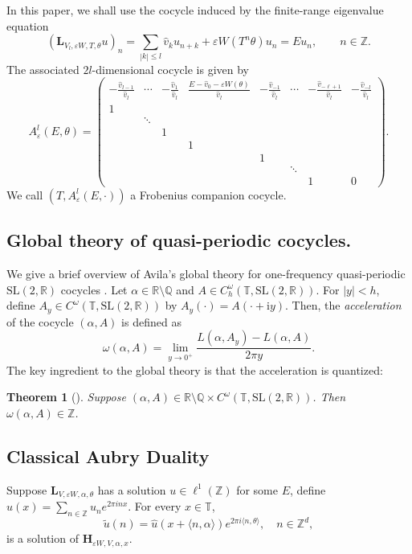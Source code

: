 \documentclass[reqno,11pt]{amsart}
\newtheorem{theorem}{Theorem}[section]
\newcommand{\R}{{\mathbb R}}
\begin{document}
In this paper, we shall use the cocycle induced by the finite-range eigenvalue equation
$$ (\mathbf L_{V_l,\varepsilon W,T,\theta}u)_n = \sum_{|k|\le l}\widehat v_k u_{n+k} + \varepsilon W(T^n\theta)u_n = Eu_n, \qquad n\in\mathbb Z. $$ The associated $2l$-dimensional cocycle is given by
\begin{equation}\label{equ:cocycle}
    A_{\varepsilon}^{l}(E,\theta)=\begin{pmatrix} -\frac{\hat v_{l-1}}{\hat v_l} & \cdots & -\frac{\hat v_{1}}{\hat v_l} & \frac{E-\hat v_0-\varepsilon W(\theta)}{\hat v_l} & -\frac{\hat v_{-1}}{\hat v_l} & \cdots & -\frac{\hat v_{-\ell+1}}{\hat v_l} & -\frac{\hat v_{-l}}{\hat v_l} \\ 1 &&&&&&&
\\& \ddots &&&&&&
\\&& 1 &&&&&
\\&&& 1&&&&
\\&&&& 1&&&
\\&&&&& \ddots&&
\\&&&&&& 1& 0
\end{pmatrix}.
\end{equation}
We call $(T,A^{l}_{\varepsilon}(E,\cdot))$ a Frobenius companion cocycle.
\subsection{Global theory of quasi-periodic cocycles.}\label{acceleration}
We give a brief overview of Avila's global theory for one-frequency quasi-periodic $\mathrm{SL}(2,\mathbb{R})$ cocycles \cite{avila}. Let $\alpha \in \mathbb{R} \setminus \mathbb{Q}$ and $A \in C^\omega_h(\mathbb{T}, \mathrm{SL}(2,\mathbb{R}))$. For $|y| < h$, define $A_y \in C^\omega(\mathbb{T}, \mathrm{SL}(2,\mathbb{R}))$ by
$A_y(\cdot) = A(\cdot + \mathrm{i} y)$. Then, the \textit{acceleration} of the cocycle $(\alpha, A)$ is defined as
\begin{equation}\label{defacc}
    \omega(\alpha, A) = \lim_{y \to 0^{+}} \frac{L(\alpha, A_{ y}) - L(\alpha, A)}{2\pi y}.
\end{equation}
		The key ingredient to the global theory is that the acceleration is quantized:
\begin{theorem}[\cite{avila}\label{acce1}]
	Suppose $(\alpha,A)\in \mathbb{R}\setminus\mathbb{Q} \times  C^{\omega}(\mathbb{T},\mathrm{SL}(2,\R))$. Then $\omega(\alpha,A)\in\mathbb{Z}$. 
\end{theorem}




\subsection{Classical Aubry Duality}
Suppose $ \mathbf{L}_{V,\varepsilon W,\alpha,\theta} $ has a solution $ u \in \ell^1(\mathbb{Z}) $ for some $ E $, define $ \hat{u}(x) = \sum_{n\in\mathbb{Z}} u_n e^{2\pi i n x} $. For every $ x\in\mathbb{T} $,
$$
\tilde{u}(n) = \hat{u}(x + \langle n, \alpha\rangle) e^{2\pi i \langle n, \theta\rangle}, \quad n\in\mathbb{Z}^d,
$$
is a solution of $ \mathbf{H}_{\varepsilon W,V,\alpha,x} $.
\end{document}
